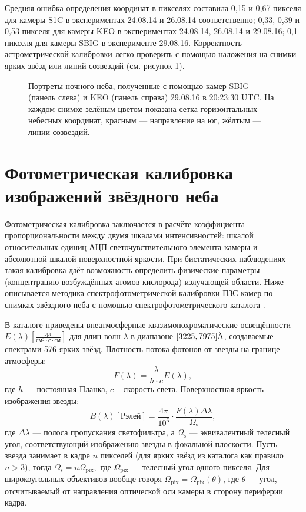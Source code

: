 \documentclass[12pt,a4paper]{article}
\newcommand{\angstrom}{\textup{\AA}}
\begin{document}
Средняя ошибка определения координат в пикселях составила 0,15 и 0,67 пикселя для камеры S1C в экспериментах 24.08.14 и 26.08.14 соответственно; 0,33, 0,39 и 0,53 пикселя для камеры KEO в экспериментах 24.08.14, 26.08.14 и 29.08.16; 0,1 пикселя для камеры SBIG в эксперименте 29.08.16. Корректность астрометрической калибровки легко проверить с помощью наложения на снимки ярких звёзд или линий созвездий (см. рисунок \ref{fig:fig2}).


\begin{figure}[h]
	\caption{Портреты ночного неба, полученные с помощью камер SBIG (панель слева) и KEO (панель справа) 29.08.16 в 20:23:30 UTC. На каждом снимке зелёным цветом показана сетка горизонтальных небесных координат, красным --- направление на юг, жёлтым --- линии созвездий.}
	\label{fig:fig2}
\end{figure}


\section{Фотометрическая калибровка изображений звёздного неба} \label{sec:spectro_cal}
Фотометрическая калибровка заключается в расчёте коэффициента пропорциональности между двумя шкалами интенсивностей: шкалой относительных единиц АЦП светочувствительного элемента камеры и абсолютной шкалой поверхностной яркости. При бистатических наблюдениях такая калибровка даёт возможность определить физические параметры (концентрацию возбуждённых атомов кислорода) излучающей области. Ниже описывается методика спектрофотометрической калибровки ПЗС-камер по снимках звёздного неба с помощью спектрофотометрического каталога \cite{Kharitonov1978}.

В каталоге \cite{Kharitonov1978} приведены внеатмосферные квазимонохроматические освещённости $E(\lambda) [\frac{\text{эрг}}{\text{см}^2 \cdot \text{с} \cdot \text{см}}]$ для длин волн $\lambda$ в диапазоне $[3225,7975]\angstrom$, создаваемые спектрами 576 ярких звёзд. Плотность потока фотонов от звезды на границе атмосферы:
\begin{equation}\label{eq:eq9}
F(\lambda)=\frac{\lambda}{h \cdot c} E(\lambda),
\end{equation}
где $h$ --- постоянная Планка, $c$ -- скорость света. Поверхностная яркость изображения звезды:
\begin{equation}\label{eq:eq10}
B(\lambda) [\text{Рэлей}] = \frac {4\pi}{10^6} \cdot \frac{F(\lambda) \Delta \lambda} {\Omega_\text{s}},
\end{equation}
где $\Delta \lambda$ --- полоса пропускания светофильтра, а $\Omega_\text{s}$ --- эквивалентный телесный угол, соответствующий изображению звезды в фокальной плоскости. Пусть звезда занимает в кадре $n$ пикселей (для ярких звёзд из каталога \cite{Kharitonov1978} как правило $n>3$), тогда $\Omega_\text{s}=n\Omega_{\text{pix}},$ где $\Omega_{\text{pix}}$ --- телесный угол одного пикселя. Для широкоугольных объективов вообще говоря $\Omega_{\text{pix}}=\Omega_{\text{pix}}(\theta)$, где $\theta$ --- угол, отсчитываемый от направления оптической оси камеры в сторону периферии кадра. 
\end{document}
